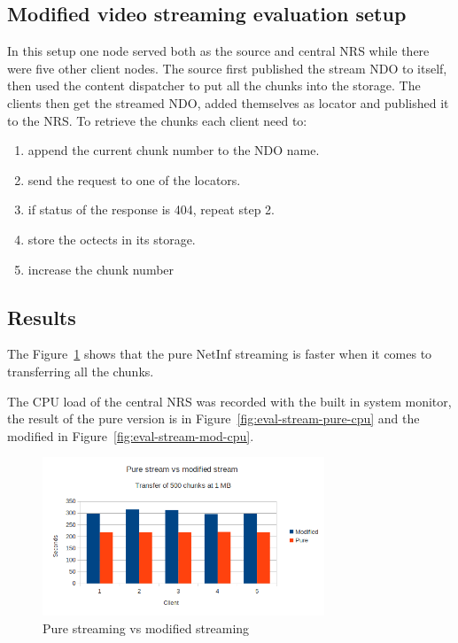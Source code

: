 \subsection{Modified video streaming evaluation setup}
In this setup one node served both as the source and central NRS while there 
were five other client nodes. The source first published the stream NDO to itself, 
then used the content dispatcher to put all the chunks into the storage.
The clients then get the streamed NDO, added themselves as 
locator and published it to the NRS. To retrieve the chunks each client need to:

\begin{enumerate}
\item append the current chunk number to the NDO name.
\item send the request to one of the locators.
\item if status of the response is 404, repeat step 2.
\item store the octects in its storage.
\item increase the chunk number
\end{enumerate}

\subsection{Results} 
The Figure~\ref{fig:eval-stream-modvspure} shows 
that the pure NetInf streaming is faster when it comes to 
transferring all the chunks. 

The CPU load of the central NRS was recorded with the built in system monitor, 
the result of the pure version is in Figure~\ref{fig:eval-stream-pure-cpu} and the modified in Figure~\ref{fig:eval-stream-mod-cpu}. 


\begin{figure}[h!]
	\centering
		\includegraphics[width=0.75\textwidth]{./img/eval-stream-plot-modvspure.png}
    	\caption{Pure streaming vs modified streaming}
	\label{fig:eval-stream-modvspure}
\end{figure}

